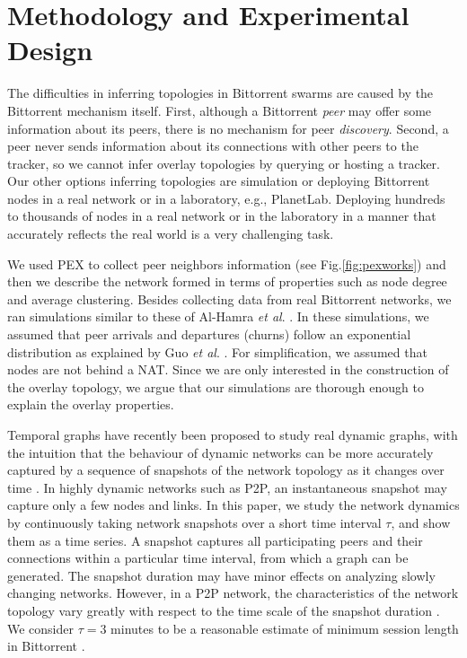\documentclass[paper]{ieice}
\begin{document}
\section{Methodology and Experimental Design}\label{methodanddesign}
The difficulties in inferring topologies in Bittorrent swarms are caused by the Bittorrent mechanism itself. 
First, although a Bittorrent \textit{peer} may offer some information about its peers, there is no mechanism for peer \textit{discovery}.  
Second, a peer never sends information about its connections with other peers to the tracker, so we cannot infer overlay topologies by querying or hosting a tracker.  
Our other options inferring topologies are simulation or deploying Bittorrent nodes in a real network or in a laboratory, e.g., PlanetLab. Deploying hundreds to thousands of nodes in a real network or in the laboratory in a manner that accurately reflects the real world is a very challenging task.

We used PEX to collect peer neighbors information  (see Fig.\ref{fig:pexworks}) and then we describe the network formed in terms of properties such as node degree and average clustering. 
Besides collecting data from real Bittorrent networks, we ran simulations similar to these of Al-Hamra \textit{et al}. \cite{al2009swarming}. 
In these simulations, we assumed that peer arrivals and departures (churns) follow an exponential distribution as explained by Guo \textit{et al}. \cite{guo2005measurements}. 
For simplification, we assumed that nodes are not behind a NAT.
Since we are only interested in the construction of the overlay topology, we argue that our simulations are thorough enough to explain the overlay properties.

Temporal graphs have recently been proposed to study real dynamic graphs, with the intuition that the behaviour of dynamic networks can be more accurately captured by a sequence of snapshots of the network topology as it changes over time \cite{grindodevolvingnet}\cite{Tang2009}.
In highly dynamic networks such as P2P, an instantaneous snapshot may capture only a few nodes and links. 
In this paper, we study the network dynamics by continuously taking network snapshots over a short time interval $\tau$, and show them as a time series.
A snapshot captures all participating peers and their connections within a particular time interval, from which a graph can be generated.
The snapshot duration may have minor effects on analyzing slowly changing networks.
However, in a P2P network, the characteristics of the network topology vary greatly with respect to the time scale of the snapshot duration \cite{stutzbach2008characterizing}.
We consider $\tau=3 $ minutes to be a reasonable estimate of minimum session length in Bittorrent \cite{stutzbach2006understanding}. 
\end{document}
